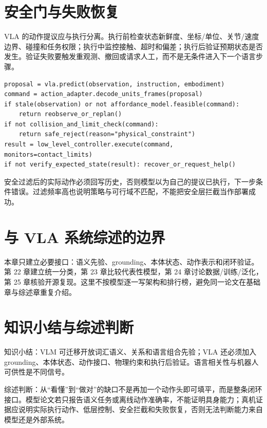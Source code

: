 \section{安全门与失败恢复}

VLA 的动作提议应与执行分离。执行前检查状态新鲜度、坐标/单位、关节/速度边界、碰撞和任务权限；执行中监控接触、超时和偏差；执行后验证预期状态是否发生。验证失败要触发重观测、撤回或请求人工，而不是无条件进入下一个语言步骤。

\begin{lstlisting}[caption={语义动作到可执行命令的安全门教学伪代码}]
proposal = vla.predict(observation, instruction, embodiment)
command = action_adapter.decode_units_frames(proposal)
if stale(observation) or not affordance_model.feasible(command):
    return reobserve_or_replan()
if not collision_and_limit_check(command):
    return safe_reject(reason="physical_constraint")
result = low_level_controller.execute(command, monitors=contact_limits)
if not verify_expected_state(result): recover_or_request_help()
\end{lstlisting}

安全过滤后的实际动作必须回写历史，否则模型以为自己的提议已执行，下一步条件错误。过滤频率高也说明策略与可行域不匹配，不能把安全层拦截当作部署成功。

\section{与 VLA 系统综述的边界}

本章只建立必要接口：语义先验、grounding、本体状态、动作表示和闭环验证。第 22 章建立统一分类，第 23 章比较代表性模型，第 24 章讨论数据/训练/泛化，第 25 章核验开源复现。这里不按模型逐一写架构和排行榜，避免同一论文在基础章与综述章重复介绍。

\section{知识小结与综述判断}

知识小结：VLM 可迁移开放词汇语义、关系和语言组合先验；VLA 还必须加入 grounding、本体状态、动作接口、物理约束和执行后验证。语言相关性与机器人可供性是不同信号。

综述判断：从“看懂”到“做对”的缺口不是再加一个动作头即可填平，而是整条闭环接口。模型论文若只报告语义任务或离线动作准确率，不能证明具身能力；真机证据应说明实际执行动作、低层控制、安全拦截和失败恢复，否则无法判断能力来自模型还是外部系统。
